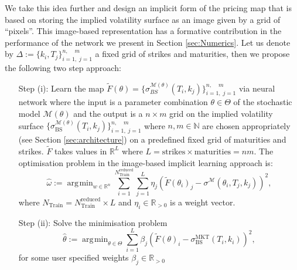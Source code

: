 \documentclass{article}
\theoremstyle{remark}
\DeclareMathOperator*{\argmin}{\arg\!\min}
\begin{document}

We take this idea further and design an implicit form of the pricing map that
is based on storing the implied volatility surface as an image given by a grid
of ``pixels''. This image-based representation has a formative contribution in
the performance of the network we present in Section \ref{sec:Numerics}. 
Let us denote by
$\Delta:=\{k_i,T_j\}_{i=1,\;j=1}^{n,\;\;\;\;m}$ a fixed grid of strikes and
maturities, then we propose the following two step approach:
\begin{enumerate}
\item[Step (i):] Learn the map
  $\widetilde{F}(\theta)=\{\sigma^{\mathcal{M}(\theta)}_{BS}(T_i,k_j)\}_{i=1,\;j=1}^{n,\;\;\;\;m}$
  via neural network where the input is a parameter combination
  $\theta\in\Theta$ of the stochastic model $\mathcal{M}(\theta)$ and the
  output is a $n\times m$ grid on the implied volatility surface
  $\{\sigma^{\mathcal{M}(\theta)}_{\mathrm{BS}}(T_i,k_j)\}_{i=1,\;j=1}^{n,\;\;\;\;m}$
  where $n,m\in\mathbb{N}$ are chosen appropriately (see Section
  \ref{sec:architecture}) on a predefined fixed grid of maturities and
  strikes. $\widetilde{F}$ takes values in $\mathbb{R}^L$  where
  $L=\textrm{strikes}\times \textrm{maturities} = nm$.
  The optimisation problem in the image-based implicit learning
  approach is:
  \begin{equation}\label{eq:gridbased_loss}
    \widehat{\omega}:=
    \argmin_{w\in\mathbb{R}^n}\sum_{i=1}^{N_{\mathrm{Train}}^{\mathrm{reduced}}}
    \sum_{j=1}^{L} \eta_j(\widetilde{F}(\theta_{i})_j-\sigma^{\mathcal{M}}(\theta_{i},T_j,k_j))^2, 
  \end{equation}
where 
$N_{\mathrm{Train}}=N_{\mathrm{Train}}^{\mathrm{reduced}} \times L$ and $\eta_i\in\mathbb{R}_{>0}$ is a weight vector.  
\item[Step (ii):] Solve the minimisation problem $$\widehat{\theta}:=\argmin_{\theta\in\Theta}\sum_{i=1}^L \beta_j(\widetilde{F}(\theta)_{i}-\sigma^{\mathrm{MKT}}_{\mathrm{BS}}(T_i,k_i))^2,$$ 
for some user specified weights $\beta_j\in\mathbb{R}_{>0}$
\end{enumerate}
\end{document}
